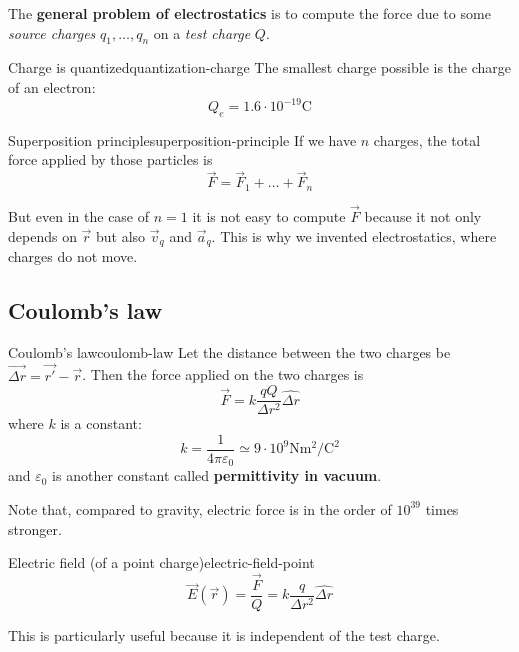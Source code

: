 \documentclass[12pt]{extarticle}
\begin{document}
The \textbf{general problem of electrostatics} is to compute the force due to some \emph{source charges} $q_1, \dots, q_n$ on a \emph{test charge} $Q$.

\begin{proposition}{Charge is quantized}{quantization-charge}
    The smallest charge possible is the charge of an electron:
    \begin{equation}
        Q_e = 1.6 \cdot 10^{-19} \si{\coulomb}
    \end{equation}
\end{proposition}

\begin{proposition}{Superposition principle}{superposition-principle}
    If we have $n$ charges, the total force applied by those particles is
    \begin{equation}
        \vec F = \vec F_1 + \dots + \vec F_n
    \end{equation}
\end{proposition}

But even in the case of $n = 1$ it is not easy to compute $\vec F$ because it not only depends on $\vec r$ but also $\vec v_q$ and $\vec a_q$.
This is why we invented electrostatics, where charges do not move.

\subsection{Coulomb's law}

\begin{theorem}{Coulomb's law}{coulomb-law}
    Let the distance between the two charges be $ \vec{\Delta r} = \vec {r'} - \vec r$.
    Then the force applied on the two charges is
    \begin{equation}
        \vec F = k \frac{qQ}{\Delta r^2} \hat{\Delta r}
    \end{equation}
    where $k$ is a constant:
    \begin{equation}
        k = \frac{1}{4\pi \varepsilon_0} \simeq 9 \cdot 10^9 \si{\newton \meter \squared \per \coulomb \squared}
    \end{equation}
    and $\varepsilon_0$ is another constant called \textbf{permittivity in vacuum}.
\end{theorem}

Note that, compared to gravity, electric force is in the order of $10^{39}$ times stronger.

\begin{definition}{Electric field (of a point charge)}{electric-field-point}
    \begin{equation}
        \vec E(\vec r) = \frac{\vec F}{Q} = k \frac{q}{\Delta r^2} \hat{\Delta r}
    \end{equation}

    This is particularly useful because it is independent of the test charge.
\end{definition}
\end{document}
